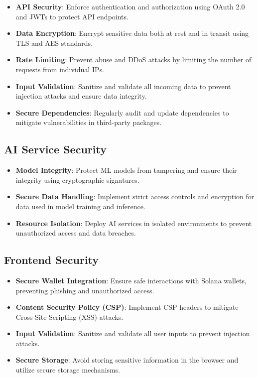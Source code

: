 \documentclass[11pt,a4paper]{article}
\begin{document}
\begin{itemize}
    \item \textbf{API Security}: Enforce authentication and authorization using OAuth 2.0 and JWTs to protect API endpoints.
    \item \textbf{Data Encryption}: Encrypt sensitive data both at rest and in transit using TLS and AES standards.
    \item \textbf{Rate Limiting}: Prevent abuse and DDoS attacks by limiting the number of requests from individual IPs.
    \item \textbf{Input Validation}: Sanitize and validate all incoming data to prevent injection attacks and ensure data integrity.
    \item \textbf{Secure Dependencies}: Regularly audit and update dependencies to mitigate vulnerabilities in third-party packages.
\end{itemize}

\subsection{AI Service Security}

\begin{itemize}
    \item \textbf{Model Integrity}: Protect ML models from tampering and ensure their integrity using cryptographic signatures.
    \item \textbf{Secure Data Handling}: Implement strict access controls and encryption for data used in model training and inference.
    \item \textbf{Resource Isolation}: Deploy AI services in isolated environments to prevent unauthorized access and data breaches.
\end{itemize}

\subsection{Frontend Security}

\begin{itemize}
    \item \textbf{Secure Wallet Integration}: Ensure safe interactions with Solana wallets, preventing phishing and unauthorized access.
    \item \textbf{Content Security Policy (CSP)}: Implement CSP headers to mitigate Cross-Site Scripting (XSS) attacks.
    \item \textbf{Input Validation}: Sanitize and validate all user inputs to prevent injection attacks.
    \item \textbf{Secure Storage}: Avoid storing sensitive information in the browser and utilize secure storage mechanisms.
\end{itemize}
\end{document}
